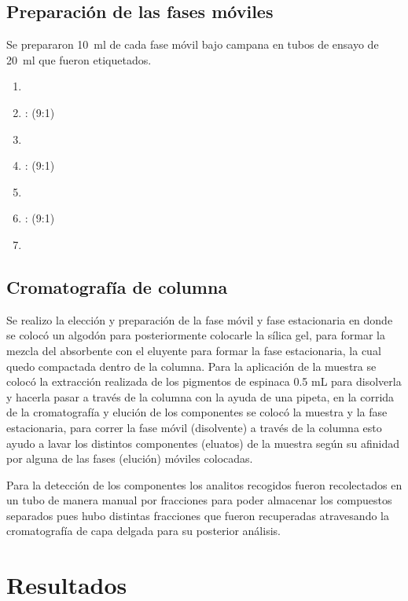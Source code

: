 \documentclass{ITESO-Report}
\begin{document}
\subsection{Preparación de las fases móviles}\label{fases moviles}

Se prepararon \qty{10}{\ml} de cada fase móvil bajo campana en tubos de ensayo de \qty{20}{\ml} que fueron etiquetados.

\begin{enumerate}
    \setlength{\itemsep}{0pt}
    \item {}
    \item {}: (9:1)
    \item {}
    \item {}: (9:1)
    \item {}
    \item {}: (9:1)
    \item {}
\end{enumerate}

\subsection{Cromatografía de columna}\label{cromatografia}

Se realizo la elección y preparación de la fase móvil y fase estacionaria en donde se colocó un algodón para posteriormente colocarle la sílica gel, para formar la mezcla del absorbente con el eluyente para formar la fase estacionaria, la cual quedo compactada dentro de la columna. Para la aplicación de la muestra se colocó la extracción realizada de los pigmentos de espinaca 0.5 mL para disolverla y hacerla pasar a través de la columna con la ayuda de una pipeta, en la corrida de la cromatografía y elución de los componentes se colocó la muestra y la fase estacionaria, para correr la fase móvil (disolvente) a través de la columna esto ayudo a lavar los distintos componentes (eluatos) de la muestra según su afinidad por alguna de las fases (elución) móviles colocadas.

Para la detección de los componentes los analitos recogidos fueron recolectados en un tubo de manera manual por fracciones para poder almacenar los compuestos separados pues hubo distintas fracciones que fueron recuperadas atravesando la cromatografía de capa delgada para su posterior análisis.

\section{Resultados}\label{resultados}
\end{document}
